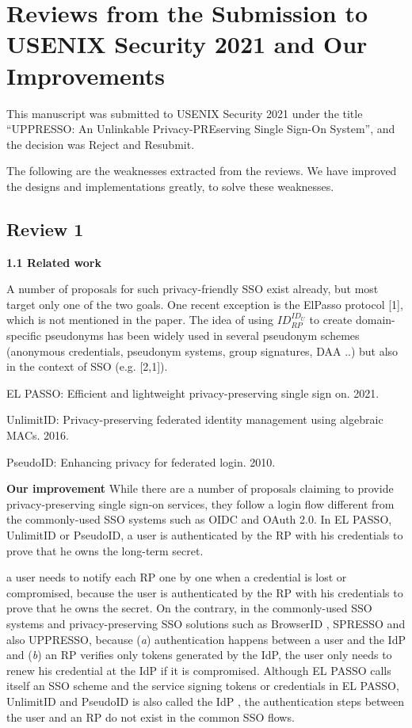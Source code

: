 \documentclass[letterpaper,onecolumn,10pt]{article}
\begin{document}
\section*{Reviews from the Submission to USENIX Security 2021 and Our Improvements}

This manuscript was submitted to USENIX Security 2021 under the title ``UPPRESSO: An Unlinkable Privacy-PREserving Single Sign-On System'',
     and the decision was Reject and Resubmit.

The following are the weaknesses extracted from the reviews.
We have improved the designs and implementations greatly, to solve these weaknesses.

\subsection*{Review 1}
\noindent\textbf{1.1 Related work}

A number of proposals for such privacy-friendly SSO exist already, but most target only one of the two goals.
One recent exception is the ElPasso protocol [1], which is not mentioned in the paper.
The idea of using $ID_{RP}^{ID_U}$ to create domain-specific pseudonyms has been widely used in several pseudonym schemes (anonymous credentials, pseudonym systems, group signatures, DAA ..) but also in the context of SSO (e.g. [2,1]).

\noindent[1] EL PASSO: Efficient and lightweight privacy-preserving single sign on. 2021.

\noindent[2] UnlimitID: Privacy-preserving federated identity management using algebraic MACs. 2016.

\noindent[3] PseudoID: Enhancing privacy for federated login. 2010.

\noindent\textbf{Our improvement}
While there are a number of proposals claiming to provide privacy-preserving single sign-on services,
    they follow a login flow different from the commonly-used SSO systems such as OIDC and OAuth 2.0.
In EL PASSO, UnlimitID or PseudoID,
    a user is authenticated by the RP with his credentials
            to prove that he owns the long-term secret.



    a user needs to notify each RP one by one when a credential is lost or compromised,
because the user is authenticated by the RP with his credentials
            to prove that he owns the secret.
On the contrary,
    in the commonly-used SSO systems \cite{OpenIDConnect,rfc6749} and privacy-preserving SSO solutions
    such as BrowserID \cite{BrowserID}, SPRESSO \cite{SPRESSO} and also UPPRESSO,
    because (\emph{a}) authentication happens between a user and the IdP
    and (\emph{b}) an RP verifies only tokens generated by the IdP,
        the user only needs to renew his credential at the IdP if it is compromised.
Although EL PASSO
 calls itself an SSO scheme \cite{ZhangKSZR21}
    and the service signing tokens or credentials in EL PASSO, UnlimitID and PseudoID is also called the IdP \cite{ZhangKSZR21,IsaakidisHD16,PseudoID},
    the authentication steps between the user and an RP do not exist in the common SSO flows.
\end{document}
